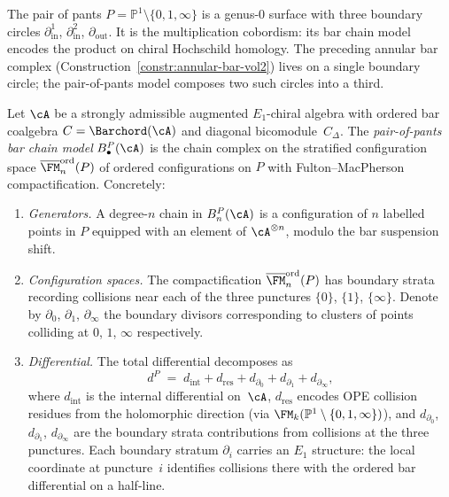 The pair of pants $P = \mathbb{P}^1\setminus\{0,1,\infty\}$ is a
genus-$0$ surface with three boundary circles
$\partial_{\mathrm{in}}^1$, $\partial_{\mathrm{in}}^2$,
$\partial_{\mathrm{out}}$. It is the multiplication cobordism:
its bar chain model encodes the product on chiral Hochschild
homology. The preceding annular bar complex
(Construction~\ref{constr:annular-bar-vol2}) lives on a single
boundary circle; the pair-of-pants model composes two such
circles into a third.

\begin{construction}%
\label{constr:pants-bar-model}%
%
%
%
Let $\cA$ be a strongly admissible augmented $E_1$-chiral algebra
with ordered bar coalgebra $C = \Barchord(\cA)$ and diagonal
bicomodule~$C_\Delta$. The \emph{pair-of-pants bar chain model}
$B^P_\bullet(\cA)$ is the chain complex on the stratified
configuration space
$\overline{\FM}_n^{\mathrm{ord}}(P)$
of ordered configurations on $P$ with Fulton--MacPherson
compactification. Concretely:
\begin{enumerate}[label=\textup{(\roman*)}]
\item \emph{Generators.}
 A degree-$n$ chain in $B^P_n(\cA)$ is a configuration of
 $n$ labelled points in $P$ equipped with an element of
 $\cA^{\otimes n}$, modulo the bar suspension shift.

\item \emph{Configuration spaces.}
 The compactification
 $\overline{\FM}_n^{\mathrm{ord}}(P)$ has boundary strata
 recording collisions near each of the three punctures
 $\{0\}$, $\{1\}$, $\{\infty\}$. Denote by
 $\partial_0$, $\partial_1$, $\partial_\infty$
 the boundary divisors corresponding to clusters of points
 colliding at $0$, $1$, $\infty$ respectively.

\item \emph{Differential.}
 The total differential decomposes as
 \begin{equation}\label{eq:pants-differential}
 d^P \;=\; d_{\mathrm{int}} + d_{\mathrm{res}}
 + d_{\partial_0} + d_{\partial_1} + d_{\partial_\infty},
 \end{equation}
 where $d_{\mathrm{int}}$ is the internal differential
 on~$\cA$, $d_{\mathrm{res}}$ encodes OPE collision residues
 from the holomorphic direction
 (via $\FM_k(\mathbb{P}^1\setminus\{0,1,\infty\})$),
 and $d_{\partial_0}$, $d_{\partial_1}$,
 $d_{\partial_\infty}$ are the boundary strata contributions
 from collisions at the three punctures. Each boundary
 stratum $\partial_i$ carries an $E_1$ structure: the
 local coordinate at puncture~$i$ identifies collisions
 there with the ordered bar differential on a half-line.


\end{enumerate}
\end{construction}
